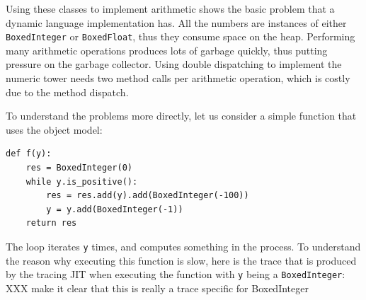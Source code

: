 \documentclass{sigplanconf}
\begin{document}
Using these classes to implement arithmetic shows the basic problem that a
dynamic language implementation has. All the numbers are instances of either
\texttt{BoxedInteger} or \texttt{BoxedFloat}, thus they consume space on the
heap. Performing many arithmetic operations produces lots of garbage quickly,
thus putting pressure on the garbage collector. Using double dispatching to
implement the numeric tower needs two method calls per arithmetic operation,
which is costly due to the method dispatch.

To understand the problems more directly, let us consider a simple function
that uses the object model:

\begin{verbatim}
def f(y):
    res = BoxedInteger(0)
    while y.is_positive():
        res = res.add(y).add(BoxedInteger(-100))
        y = y.add(BoxedInteger(-1))
    return res
\end{verbatim}

The loop iterates \texttt{y} times, and computes something in the process. To
understand the reason why executing this function is slow, here is the trace
that is produced by the tracing JIT when executing the function with \texttt{y}
being a \texttt{BoxedInteger}: XXX make it clear that this is really a trace specific for BoxedInteger
\end{document}
